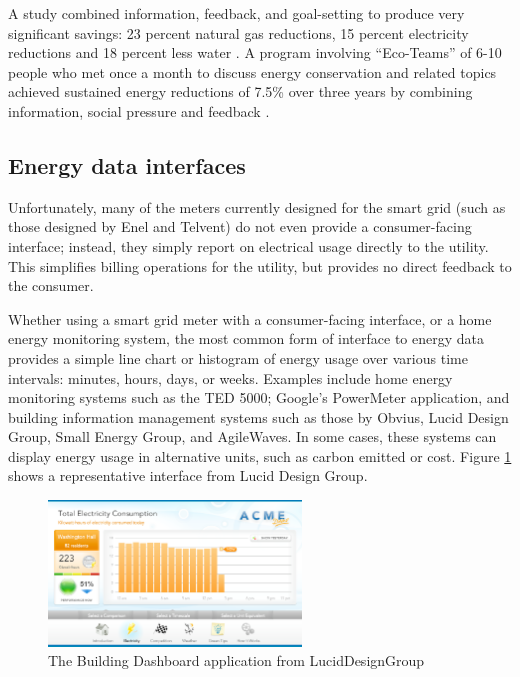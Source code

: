 A study combined information, feedback, and goal-setting to produce very
significant savings: 23 percent natural gas reductions, 15 percent
electricity reductions and 18 percent less water \cite{Vollink99}.  A
program involving ``Eco-Teams'' of 6-10 people who met once a month to
discuss energy conservation and related topics achieved sustained energy
reductions of 7.5\% over three years by combining information, social
pressure and feedback \cite{Staats04}.

\subsection{Energy data interfaces}

Unfortunately, many of the meters currently designed for the smart grid
(such as those designed by Enel and Telvent) do not even provide a
consumer-facing interface; instead, they simply report on electrical usage
directly to the utility.  This simplifies billing operations for the
utility, but provides no direct feedback to the consumer.

Whether using a smart grid meter with a consumer-facing interface, or a
home energy monitoring system, the most common form of interface to energy
data provides a simple line chart or histogram of energy usage over various
time intervals: minutes, hours, days, or weeks.  Examples include home
energy monitoring systems such as the TED 5000; Google's PowerMeter
application, and building information management systems such as those by
Obvius, Lucid Design Group, Small Energy Group, and AgileWaves. In some
cases, these systems can display energy usage in alternative units, such as
carbon emitted or cost.  Figure \ref{fig:LucidDesignGroup} shows a representative interface from
Lucid Design Group.

\begin{figure}[th]
  \center
  \includegraphics[width=0.6\textwidth]{luciddesigngroup.3.eps}
  \caption{\small The Building Dashboard application from LucidDesignGroup}
  \label{fig:LucidDesignGroup}
\end{figure} 


